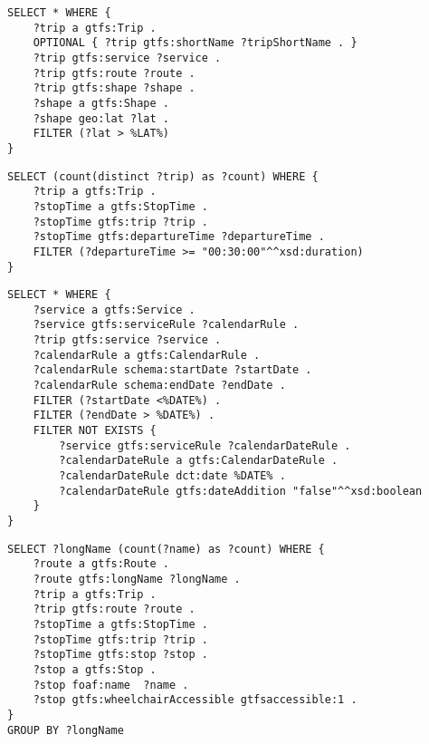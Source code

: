 \begin{lstlisting}[caption=Query 9 - Trips and associated shapes where lat is bigger than its average and some of their additional data, label=lst:sparql9, basicstyle=\ttfamily,frame=single]
SELECT * WHERE {
	?trip a gtfs:Trip .
	OPTIONAL { ?trip gtfs:shortName ?tripShortName . }
	?trip gtfs:service ?service .
	?trip gtfs:route ?route .
	?trip gtfs:shape ?shape .
	?shape a gtfs:Shape .
	?shape geo:lat ?lat .
	FILTER (?lat > %LAT%)
}
\end{lstlisting}

\begin{lstlisting}[caption=Query 10 - Number of trips that have a duration over 30 minutes, label=lst:sparql10,basicstyle=\ttfamily,frame=single]
SELECT (count(distinct ?trip) as ?count) WHERE {
	?trip a gtfs:Trip .
	?stopTime a gtfs:StopTime . 
	?stopTime gtfs:trip ?trip . 
	?stopTime gtfs:departureTime ?departureTime .
	FILTER (?departureTime >= "00:30:00"^^xsd:duration) 
}
\end{lstlisting}

\begin{lstlisting}[caption=Query 11 - Trips that are available on a certain date and some of their additional data, label=lst:sparql11, basicstyle=\ttfamily,frame=single]
SELECT * WHERE {
    ?service a gtfs:Service .
    ?service gtfs:serviceRule ?calendarRule .
    ?trip gtfs:service ?service .
    ?calendarRule a gtfs:CalendarRule .
    ?calendarRule schema:startDate ?startDate .
    ?calendarRule schema:endDate ?endDate .
    FILTER (?startDate <%DATE%) .
    FILTER (?endDate > %DATE%) .
    FILTER NOT EXISTS {
        ?service gtfs:serviceRule ?calendarDateRule . 
        ?calendarDateRule a gtfs:CalendarDateRule .
        ?calendarDateRule dct:date %DATE% .
        ?calendarDateRule gtfs:dateAddition "false"^^xsd:boolean 
    }
}
\end{lstlisting}

\begin{lstlisting}[caption=Query 12 - Number of stops that are wheelchair-accessible grouped by route and some of their additional data, label=lst:sparql12,basicstyle=\ttfamily,frame=single]
SELECT ?longName (count(?name) as ?count) WHERE { 	
	?route a gtfs:Route .
	?route gtfs:longName ?longName .
 	?trip a gtfs:Trip .
	?trip gtfs:route ?route .
 	?stopTime a gtfs:StopTime .
	?stopTime gtfs:trip ?trip .
	?stopTime gtfs:stop ?stop .
  	?stop a gtfs:Stop .
 	?stop foaf:name  ?name .
 	?stop gtfs:wheelchairAccessible gtfsaccessible:1 .	
}
GROUP BY ?longName
\end{lstlisting}

